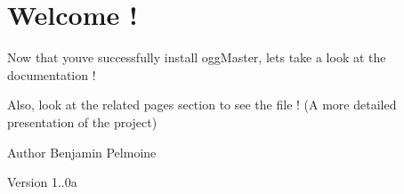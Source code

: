 \hypertarget{index__welcome}{}\section{Welcome !}\label{index__welcome}
Now that you\textquotesingle{}ve successfully install ogg\+Master, let\textquotesingle{}s take a look at the documentation !



Also, look at the related pages section to see the file ! (A more detailed presentation of the project)

\begin{DoxyAuthor}{Author}
Benjamin Pelmoine 
\end{DoxyAuthor}
\begin{DoxyVersion}{Version}
1..\+0a 
\end{DoxyVersion}
